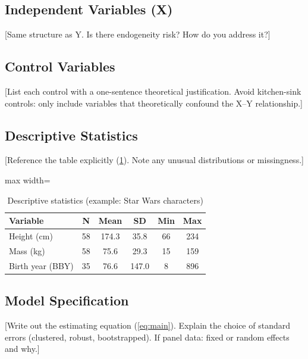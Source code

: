 \subsection{Independent Variables (X)} %
[Same structure as Y. Is there endogeneity risk? How do you address it?]

\subsection{Control Variables} %
[List each control with a one-sentence theoretical justification. Avoid kitchen-sink controls: only include variables that theoretically confound the X--Y relationship.]

\subsection{Descriptive Statistics} %
[Reference the table explicitly (\cref{tab:descr}). Note any unusual distributions or missingness.]

\begin{table}[htbp]
    \centering
    \footnotesize
    \caption{Descriptive statistics (example: Star Wars characters)}
    \label{tab:descr}
    \begin{adjustbox}{max width=\linewidth}
    \begin{tabular}{l*{5}{c}}
        \toprule
        Variable         & N  & Mean  & SD    & Min & Max \\
        \midrule
        Height (cm)      & 58 & 174.3 & 35.8  & 66  & 234 \\
        Mass (kg)        & 58 & 75.6  & 29.3  & 15  & 159 \\
        Birth year (BBY) & 35 & 76.6  & 147.0 & 8   & 896 \\
        \bottomrule
    \end{tabular}
    \end{adjustbox}
\end{table}

\subsection{Model Specification} %
[Write out the estimating equation (\cref{eq:main}). Explain the choice of standard errors (clustered, robust, bootstrapped). If panel data: fixed or random effects and why.]

